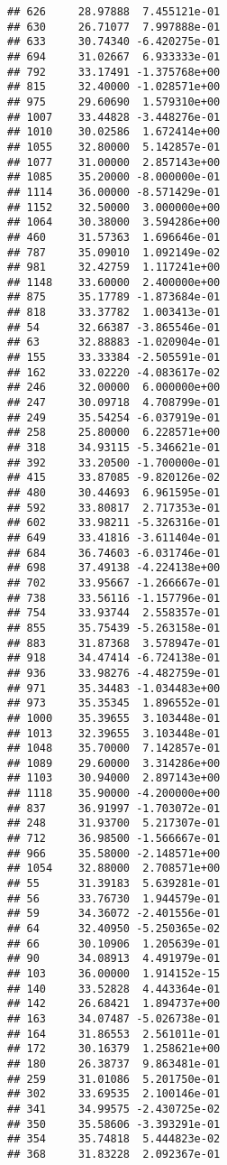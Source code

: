 \documentclass[
]{article}
\begin{document}
\begin{verbatim}
## 626     28.97888  7.455121e-01
## 630     26.71077  7.997888e-01
## 633     30.74340 -6.420275e-01
## 694     31.02667  6.933333e-01
## 792     33.17491 -1.375768e+00
## 815     32.40000 -1.028571e+00
## 975     29.60690  1.579310e+00
## 1007    33.44828 -3.448276e-01
## 1010    30.02586  1.672414e+00
## 1055    32.80000  5.142857e-01
## 1077    31.00000  2.857143e+00
## 1085    35.20000 -8.000000e-01
## 1114    36.00000 -8.571429e-01
## 1152    32.50000  3.000000e+00
## 1064    30.38000  3.594286e+00
## 460     31.57363  1.696646e-01
## 787     35.09010  1.092149e-02
## 981     32.42759  1.117241e+00
## 1148    33.60000  2.400000e+00
## 875     35.17789 -1.873684e-01
## 818     33.37782  1.003413e-01
## 54      32.66387 -3.865546e-01
## 63      32.88883 -1.020904e-01
## 155     33.33384 -2.505591e-01
## 162     33.02220 -4.083617e-02
## 246     32.00000  6.000000e+00
## 247     30.09718  4.708799e-01
## 249     35.54254 -6.037919e-01
## 258     25.80000  6.228571e+00
## 318     34.93115 -5.346621e-01
## 392     33.20500 -1.700000e-01
## 415     33.87085 -9.820126e-02
## 480     30.44693  6.961595e-01
## 592     33.80817  2.717353e-01
## 602     33.98211 -5.326316e-01
## 649     33.41816 -3.611404e-01
## 684     36.74603 -6.031746e-01
## 698     37.49138 -4.224138e+00
## 702     33.95667 -1.266667e-01
## 738     33.56116 -1.157796e-01
## 754     33.93744  2.558357e-01
## 855     35.75439 -5.263158e-01
## 883     31.87368  3.578947e-01
## 918     34.47414 -6.724138e-01
## 936     33.98276 -4.482759e-01
## 971     35.34483 -1.034483e+00
## 973     35.35345  1.896552e-01
## 1000    35.39655  3.103448e-01
## 1013    32.39655  3.103448e-01
## 1048    35.70000  7.142857e-01
## 1089    29.60000  3.314286e+00
## 1103    30.94000  2.897143e+00
## 1118    35.90000 -4.200000e+00
## 837     36.91997 -1.703072e-01
## 248     31.93700  5.217307e-01
## 712     36.98500 -1.566667e-01
## 966     35.58000 -2.148571e+00
## 1054    32.88000  2.708571e+00
## 55      31.39183  5.639281e-01
## 56      33.76730  1.944579e-01
## 59      34.36072 -2.401556e-01
## 64      32.40950 -5.250365e-02
## 66      30.10906  1.205639e-01
## 90      34.08913  4.491979e-01
## 103     36.00000  1.914152e-15
## 140     33.52828  4.443364e-01
## 142     26.68421  1.894737e+00
## 163     34.07487 -5.026738e-01
## 164     31.86553  2.561011e-01
## 172     30.16379  1.258621e+00
## 180     26.38737  9.863481e-01
## 259     31.01086  5.201750e-01
## 302     33.69535  2.100146e-01
## 341     34.99575 -2.430725e-02
## 350     35.58606 -3.393291e-01
## 354     35.74818  5.444823e-02
## 368     31.83228  2.092367e-01

\end{verbatim}
\end{document}
